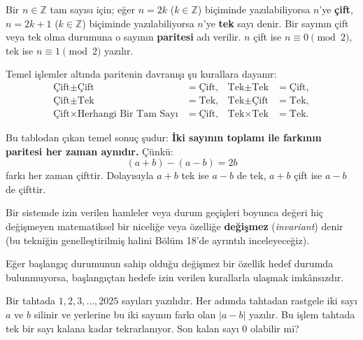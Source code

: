 \begin{definition}[Parite]
Bir $n \in \mathbb{Z}$ tam sayısı için; eğer $n = 2k$ ($k \in \mathbb{Z}$) biçiminde yazılabiliyorsa $n$'ye \textbf{çift}, $n = 2k + 1$ ($k \in \mathbb{Z}$) biçiminde yazılabiliyorsa $n$'ye \textbf{tek} sayı denir. Bir sayının çift veya tek olma durumuna o sayının \textbf{paritesi} adı verilir. $n$ çift ise $n \equiv 0 \pmod 2$, tek ise $n \equiv 1 \pmod 2$ yazılır.
\end{definition}

Temel işlemler altında paritenin davranışı şu kurallara dayanır:
\begin{align*}
\text{Çift} \pm \text{Çift} &= \text{Çift}, & \text{Tek} \pm \text{Tek} &= \text{Çift}, \\
\text{Çift} \pm \text{Tek} &= \text{Tek}, & \text{Tek} \pm \text{Çift} &= \text{Tek}, \\
\text{Çift} \times \text{Herhangi Bir Tam Sayı} &= \text{Çift}, & \text{Tek} \times \text{Tek} &= \text{Tek}.
\end{align*}

Bu tablodan çıkan temel sonuç şudur: \textbf{İki sayının toplamı ile farkının paritesi her zaman aynıdır.} Çünkü:
\[
(a + b) - (a - b) = 2b
\]
farkı her zaman çifttir. Dolayısıyla $a+b$ tek ise $a-b$ de tek, $a+b$ çift ise $a-b$ de çifttir.

\begin{definition}
Bir sistemde izin verilen hamleler veya durum geçişleri boyunca değeri hiç değişmeyen matematiksel bir niceliğe veya özelliğe \textbf{değişmez} (\textit{invariant}) denir (bu tekniğin genelleştirilmiş halini Bölüm 18'de ayrıntılı inceleyeceğiz).
\end{definition}

Eğer başlangıç durumunun sahip olduğu değişmez bir özellik hedef durumda bulunmuyorsa, başlangıçtan hedefe izin verilen kurallarla ulaşmak imkânsızdır.

\begin{example}
Bir tahtada $1, 2, 3, \dots, 2025$ sayıları yazılıdır. Her adımda tahtadan rastgele iki sayı $a$ ve $b$ silinir ve yerlerine bu iki sayının farkı olan $|a - b|$ yazılır. Bu işlem tahtada tek bir sayı kalana kadar tekrarlanıyor. Son kalan sayı $0$ olabilir mi?
\end{example}

